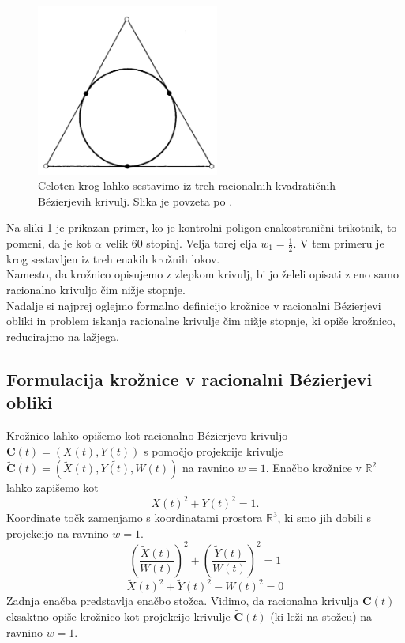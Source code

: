 \documentclass[a4paper,11pt]{article}
\theoremstyle{definition}
\theoremstyle{plain}
\begin{document}
\begin{figure}[ht!]
    \centering
    \includegraphics[width=60mm]{krog_po_delih.png}
    \caption{Celoten krog lahko sestavimo iz treh racionalnih kvadratičnih B\'ezierjevih krivulj. Slika je povzeta po \cite{farin}.}
    \label{slika:krogpodelih}
\end{figure}
\noindent
Na sliki \ref{slika:krogpodelih} je prikazan primer, ko je kontrolni poligon enakostranični trikotnik, to pomeni, da je kot $\alpha$ velik 60 stopinj. Velja torej elja $w_1 = \frac{1}{2}$. V tem primeru je krog sestavljen iz treh enakih krožnih lokov.
\\

Namesto, da krožnico opisujemo z zlepkom krivulj, bi jo želeli opisati z eno samo racionalno krivuljo čim nižje stopnje.
\\
Nadalje si najprej oglejmo formalno definicijo krožnice v racionalni B\'ezierjevi obliki in problem iskanja racionalne krivulje čim nižje stopnje, ki opiše krožnico, reducirajmo na lažjega.

\subsection{Formulacija krožnice v racionalni B\'ezierjevi obliki}
Krožnico lahko opišemo kot racionalno B\'ezierjevo krivuljo $\boldsymbol{C}(t)=(X(t),Y(t))$ s pomočjo projekcije krivulje $\boldsymbol{\tilde{C}}(t)=(\tilde{X}(t), \tilde{Y(t)}, W(t))$ na ravnino $w=1$. 
Enačbo krožnice v $\mathbb{R}^2$ lahko zapišemo kot
$$X(t)^2+Y(t)^2=1.$$
Koordinate točk zamenjamo s koordinatami prostora $\mathbb{R}^3$, ki smo jih dobili s projekcijo na ravnino $w=1$.
$$\left(\frac{\tilde{X}(t)}{W(t)}\right)^2+\left(\frac{\tilde{Y}(t)}{W(t)}\right)^2=1$$
$$\tilde{X}(t)^2+\tilde{Y}(t)^2-W(t)^2=0$$
Zadnja enačba predstavlja enačbo stožca. Vidimo, da racionalna krivulja $\boldsymbol{C}(t)$ eksaktno opiše krožnico kot projekcijo krivulje $\boldsymbol{\tilde{C}}(t)$ (ki leži na stožcu) na ravnino $w = 1$.
\end{document}
